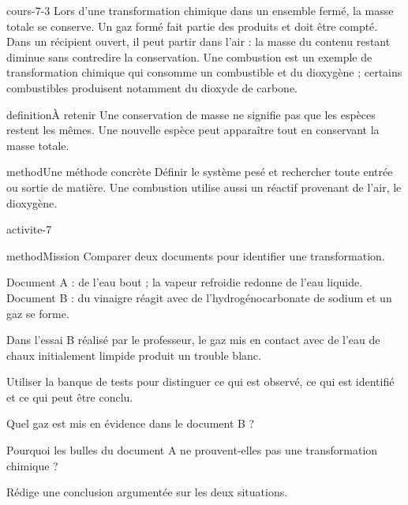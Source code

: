 \documentclass[12pt,twoside,openany]{book}
\begin{document}
\label{ch-7-cours-3}
\begin{pcFiche}{cours-7-3}
Lors d’une transformation chimique dans un ensemble fermé, la masse totale se conserve. Un gaz formé fait partie des produits et doit être compté. Dans un récipient ouvert, il peut partir dans l’air : la masse du contenu restant diminue sans contredire la conservation. Une combustion est un exemple de transformation chimique qui consomme un combustible et du dioxygène ; certains combustibles produisent notamment du dioxyde de carbone.\par
{}
\begin{pcEncadre}{definition}{À retenir}
Une conservation de masse ne signifie pas que les espèces restent les mêmes. Une nouvelle espèce peut apparaître tout en conservant la masse totale.\par
\end{pcEncadre}
\begin{pcEncadre}{method}{Une méthode concrète}
Définir le système pesé et rechercher toute entrée ou sortie de matière. Une combustion utilise aussi un réactif provenant de l’air, le dioxygène.\par
\end{pcEncadre}
\end{pcFiche}
\label{ch-7-activite}
\begin{pcFiche}{activite-7}
\begin{pcEncadre}{method}{Mission}
Comparer deux documents pour identifier une transformation.\par
\end{pcEncadre}
\begin{questions}
\item Document A : de l’eau bout ; la vapeur refroidie redonne de l’eau liquide. Document B : du vinaigre réagit avec de l’hydrogénocarbonate de sodium et un gaz se forme.
\item Dans l’essai B réalisé par le professeur, le gaz mis en contact avec de l’eau de chaux initialement limpide produit un trouble blanc.
\item Utiliser la banque de tests pour distinguer ce qui est observé, ce qui est identifié et ce qui peut être conclu.
\end{questions}
\begin{questions}
\item Quel gaz est mis en évidence dans le document B ?
\item Pourquoi les bulles du document A ne prouvent-elles pas une transformation chimique ?
\item Rédige une conclusion argumentée sur les deux situations.
\end{questions}
\end{pcFiche}
\end{document}
